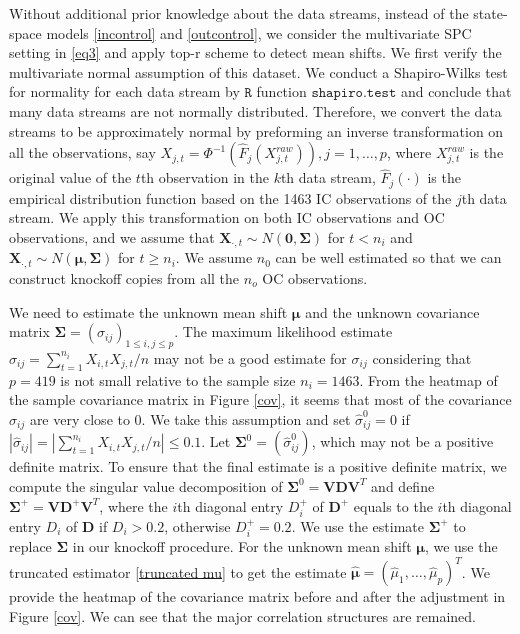\documentclass[a4paper,12pt]{article}
\begin{document}
Without additional prior knowledge about the data streams, instead of the state-space models \eqref{incontrol} and \eqref{outcontrol}, we consider the multivariate SPC setting in \eqref{eq3} and apply top-r scheme to detect mean shifts. We first verify the multivariate normal assumption of this dataset. We conduct a Shapiro-Wilks test for normality for each data stream by $\mathtt{R}$ function $\mathtt{shapiro.test}$ and conclude that many data streams are not normally distributed. Therefore, we convert the data streams to be approximately normal by preforming an inverse transformation on all the observations, say $X_{j,t}=\Phi^{-1}\left( \hat F_{j}(X_{j,t}^{raw})\right), j=1, \ldots, p$, where $X_{j,t}^{raw}$ is the original value of the $t$th observation in the $k$th data stream, $\hat F_{j}(\cdot)$ is the empirical distribution function based on the 1463 IC observations of the $j$th data stream. We apply this transformation on both IC observations and OC observations, and we assume that $\bm{X}_{\cdot,t}\sim N(\bm{0},\bm\Sigma)$ for $t<n_i$ and $\bm{X}_{\cdot,t}\sim N(\bm\mu,\bm\Sigma)$ for $t\geq n_i$. We assume $n_0$ can be well estimated so that we can construct knockoff copies from all the $n_o$ OC observations. 

We need to estimate the unknown mean shift $\bm\mu$ and the unknown covariance matrix $\bm\Sigma=(\sigma_{ij})_{1\leq i,j\leq p}$. The maximum likelihood estimate $\hat{\sigma}_{ij}=\sum_{t=1}^{n_i}X_{i,t}X_{j,t}/n$ may not be a good estimate for $\sigma_{ij}$ considering that $p=419$ is not small relative to the sample size $n_i=1463$. From the heatmap of the sample covariance matrix in Figure \ref{cov}, it seems that most of the covariance $\sigma_{ij}$ are very close to 0. We take this assumption and set $\hat{\sigma}_{ij}^0=0$ if $|\hat{\sigma}_{ij}|=|\sum_{t=1}^{n_i}X_{i,t}X_{j,t}/n|\leq 0.1$. Let $\bm\Sigma^0=(\hat{\sigma}_{ij}^0)$, which may not be a positive definite matrix. To ensure that the final estimate is a positive definite matrix, we compute the singular value decomposition of $\bm\Sigma^0=\bm V \bm D \bm V^T$ and define $\bm\Sigma^+=\bm V \bm{D}^+ \bm V^T$, where the $i$th diagonal entry $D^+_i$ of $\bm{D}^+$ equals to the $i$th diagonal entry $D_i$ of $\bm{D}$ if $D_i>0.2$, otherwise $D^+_i=0.2$. We use the estimate $\bm\Sigma^+$ to replace $\bm\Sigma$ in our knockoff procedure. For the unknown mean shift $\bm\mu$, we use the truncated estimator \eqref{truncated mu} to get the estimate $\hat{\bm\mu}=(\hat{\mu}_1,\ldots,\hat{\mu}_p)^T$. We provide the heatmap of the covariance matrix before and after the adjustment in Figure \ref{cov}. We can see that the major correlation structures are remained.
\end{document}
